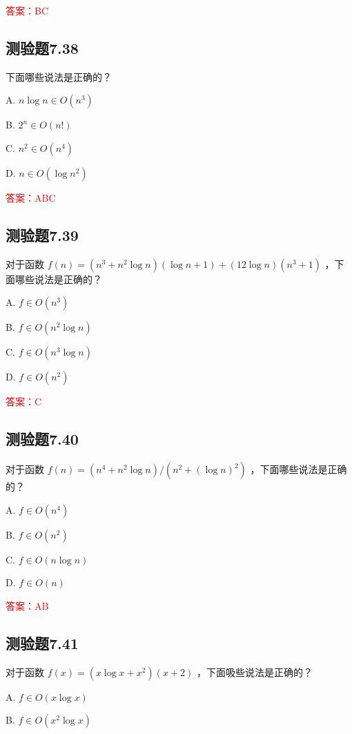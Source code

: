\documentclass[UTF8, heading=true]{ctexart}
\begin{document}
\textcolor{red}{答案：BC}

\subsection{测验题7.38}

下面哪些说法是正确的？

A. $ n \log n \in O\left(n^3\right)$

B. $2^n \in O(n!)$

C. $n^2 \in O\left(n^4\right)$

D. $ n \in O\left(\log n^2\right)$

\textcolor{red}{答案：ABC}


\subsection{测验题7.39}

对于函数 $f(n)=\left(n^3+n^2 \log n\right)(\log n+1)+(12 \log n)\left(n^3+1\right)$ ，下面哪些说法是正确的？

A. $f \in O\left(n^3\right)$

B. $f \in O\left(n^2 \log n\right)$

C. $f \in O\left(n^3 \log n\right)$

D. $f \in O\left(n^2\right)$


\textcolor{red}{答案：C}

\subsection{测验题7.40}

对于函数 $f(n)=\left(n^4+n^2 \log n\right) /\left(n^2+(\log n)^2\right)$ ，下面哪些说法是正确的？

A. $ f \in O\left(n^4\right)$

B. $ f \in O\left(n^2\right)$

C. $ f \in O(n \log n)$

D. $f \in O(n)$

\textcolor{red}{答案：AB}


\subsection{测验题7.41}

对于函数 $f(x)=\left(x \log x+x^2\right)(x+2)$ ，下面吸些说法是正确的？

A. $ f \in O(x \log x)$

B. $f \in O\left(x^2 \log x\right)$
\end{document}
